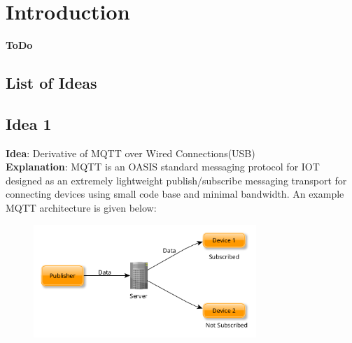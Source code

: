 \documentclass[a4paper,10pt]{book}
\newenvironment*{chapterenv}{}{}
\newcommand\tab[1][0.5cm]{\hspace*{#1}}
\begin{document}
\tableofcontents

\begin{chapterenv}
    \chapter{Introduction}
    \textbf{ToDo}
\end{chapterenv}



\begin{appendices}
\begin{chapterenv}
    \chapter{List of Ideas}
    \section{Idea 1}
    \textbf{Idea}: Derivative of MQTT over Wired Connections(USB)\\
    \textbf{Explanation}:
    \newline
    \tab MQTT is an OASIS standard messaging protocol for IOT designed as an extremely lightweight publish/subscribe messaging transport for connecting devices using small code base and minimal bandwidth. An example MQTT architecture is given below:
    \begin{figure}[H]
    \centering
    \includegraphics[width=0.75\textwidth,keepaspectratio=true]{img/Appendix A/I1/MQTT.png}
    \end{figure}
    

\end{chapterenv}
\end{appendices}
\end{document}
